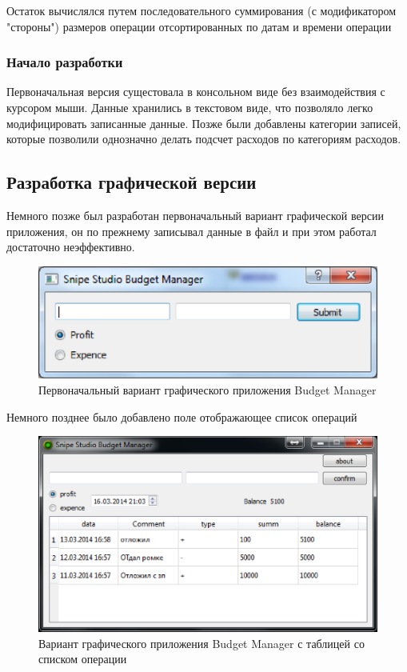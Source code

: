 Остаток вычислялся путем последовательного суммирования (с модификатором "стороны") размеров операции отсортированных по датам и времени
операции

\subsubsection{Начало разработки}
Первоначальная версия сущестовала в консольном виде без взаимодействия с курсором мыши. Данные хранились в текстовом виде, что позволяло
легко модифицировать записанные данные. Позже были добавлены категории записей, которые позволили однозначно делать подсчет расходов по категориям расходов.

\subsection{Разработка графической версии}
Немного позже был разработан первоначальный вариант графической версии приложения, он по прежнему записывал данные в файл и при этом работал достаточно неэффективно.

\begin{figure}[H]
	\centering
	\includegraphics[width=0.7\linewidth]{pics/firstVersion.eps}
	\caption{Первоначальный вариант графического приложения Budget Manager}
	\label{fig:firstVersion}
\end{figure}

Немного позднее было добавлено поле отображающее список операций

\begin{figure}[H]
	\centering
	\includegraphics[width=0.7\linewidth]{pics/secondVersion.eps}
	\caption{Вариант графического приложения Budget Manager с таблицей со списком
операции}
	\label{fig:secondVersion}
\end{figure}

